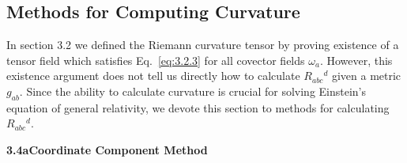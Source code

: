 
\subsection{Methods for Computing Curvature}\label{sec:3.4}

In section 3.2 we defined the Riemann curvature tensor by proving existence of
a tensor field which satisfies Eq.~\eqref{eq:3.2.3} for all covector fields $\omega_a$. However,
this existence argument does not tell us directly how to calculate $R_{abc}{}^d$ given a metric
$g_{ab}$. Since the ability to calculate curvature is crucial for solving Einstein's equation
of general relativity, we devote this section to methods for calculating $R_{abc}{}^d$.

\medskip
\noindent\textbf{3.4a\quad Coordinate Component Method}

